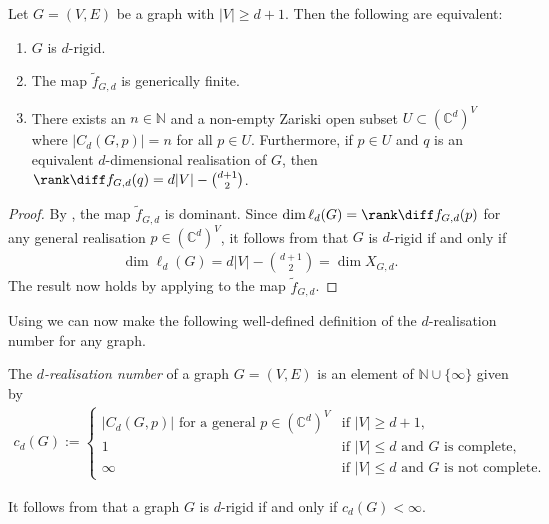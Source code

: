 \begin{proposition}\label{p:dom}
	Let $G=(V,E)$ be a graph with $|V| \geq d+1$.
	Then the following are equivalent:
	\begin{enumerate}
		\item\label{p:dom1} $G$ is $d$-rigid.
		\item\label{p:dom2} The map $\tilde{f}_{G,d}$ is generically finite.
		\item\label{p:dom3} There exists an $n \in \mathbb{N}$ and a non-empty Zariski open subset $U \subset (\mathbb{C}^d)^V$ where $ |C_d(G,p)|=n$ for all $p \in U$.
		Furthermore,
		if $p \in U$ and $q$ is an equivalent $d$-dimensional realisation of $G$,
		then $\rank \diff f_{G,d}(q) =  d|V| - \binom{d+1}{2}$.
	\end{enumerate}
\end{proposition} 

\begin{proof}
	By ,
	the map $\tilde{f}_{G,d}$ is dominant.	
	Since $\dim \ell_d(G) = \rank \diff f_{G,d}(p)$ for any general realisation $p\in (\mathbb{C}^d)^V$,
	it follows from  that $G$ is $d$-rigid if and only if 
	\begin{align*}
		\dim \ell_d(G) = d|V|- \binom{d+1}{2} = \dim X_{G,d}.
	\end{align*}
	The result now holds by applying  to the map $\tilde{f}_{G,d}$.
\end{proof}

Using  we can now make the following well-defined definition of the $d$-realisation number for any graph.

\begin{definition}\label{def:count}
	The \emph{$d$-realisation number} of a graph $G=(V,E)$ is an element of $\mathbb{N} \cup \{\infty\}$ given by
	\begin{align*}
		c_d(G) :=		
		\begin{cases}
			|C_d(G,p)| \text{ for a general $p \in (\mathbb{C}^d)^V$} &\text{if } |V| \geq d+1, \\
			 1 &\text{if } |V| \leq d \text{ and $G$ is complete}, \\
			 \infty &\text{if } |V| \leq d \text{ and $G$ is not complete}.
		\end{cases}
	\end{align*}
\end{definition}

It follows from  that a graph $G$ is $d$-rigid if and only if $c_d(G) < \infty$.

